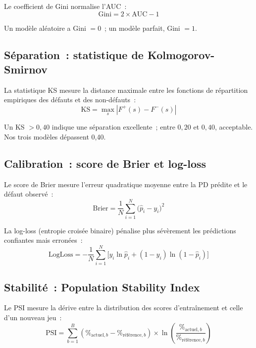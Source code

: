 \documentclass[12pt, a4paper, twoside, openright]{report}
\theoremstyle{definition}
\begin{document}
Le coefficient de Gini normalise l'AUC~:
\begin{equation}
\text{Gini} = 2 \times \text{AUC} - 1
\label{eq:gini}
\end{equation}

Un modèle aléatoire a Gini $= 0$~; un modèle parfait, Gini $= 1$.

\subsection{Séparation~: statistique de Kolmogorov-Smirnov}

La statistique KS mesure la distance maximale entre les fonctions de répartition empiriques des défauts et des non-défauts~:
\begin{equation}
\text{KS} = \max_s \left| F^+(s) - F^-(s) \right|
\label{eq:ks}
\end{equation}

Un KS $> 0{,}40$ indique une séparation excellente~; entre $0{,}20$ et $0{,}40$, acceptable. Nos trois modèles dépassent 0{,}40.

\subsection{Calibration~: score de Brier et log-loss}

Le score de Brier mesure l'erreur quadratique moyenne entre la PD prédite et le défaut observé~:
\begin{equation}
\text{Brier} = \frac{1}{N} \sum_{i=1}^{N} \bigl(\hat{p}_i - y_i\bigr)^2
\label{eq:brier}
\end{equation}

La log-loss (entropie croisée binaire) pénalise plus sévèrement les prédictions confiantes mais erronées~:
\begin{equation}
\text{LogLoss} = -\frac{1}{N} \sum_{i=1}^{N} \bigl[y_i \ln \hat{p}_i + (1 - y_i) \ln(1 - \hat{p}_i)\bigr]
\label{eq:logloss}
\end{equation}

\subsection{Stabilité~: Population Stability Index}

Le PSI mesure la dérive entre la distribution des scores d'entraînement et celle d'un nouveau jeu~:
\begin{equation}
\text{PSI} = \sum_{b=1}^{B} \left(\%_{\text{actuel},b} - \%_{\text{référence},b}\right) \times \ln\!\left(\frac{\%_{\text{actuel},b}}{\%_{\text{référence},b}}\right)
\label{eq:psi}
\end{equation}
\end{document}
